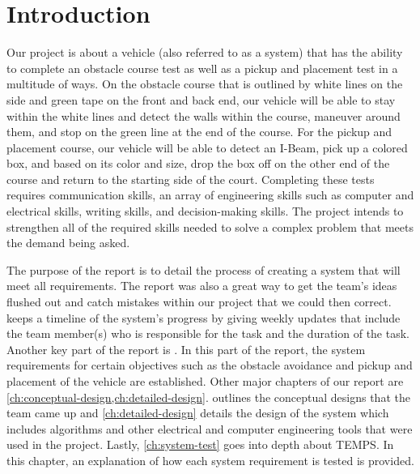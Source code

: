 \documentclass[12pt]{report}
\begin{document}
\chapter{Introduction}\label{ch:introduction}
\onehalfspacing

Our project is about a vehicle (also referred to as a system) that has the ability to complete an obstacle course test as well as a pickup and placement test in a multitude of ways. On the obstacle course that is outlined by white lines on the side and green tape on the front and back end, our vehicle will be able to stay within the white lines and detect the walls within the course, maneuver around them, and stop on the green line at the end of the course. For the pickup and placement course, our vehicle will be able to detect an I-Beam, pick up a colored box, and based on its color and size, drop the box off on the other end of the course and return to the starting side of the court. Completing these tests requires communication skills, an array of engineering skills such as computer and electrical skills, writing skills, and decision-making skills. The project intends to strengthen all of the required skills needed to solve a complex problem that meets the demand being asked.

The purpose of the report is to detail the process of creating a system that will meet all requirements. The report was also a great way to get the team’s ideas flushed out and catch mistakes within our project that we could then correct.  keeps a timeline of the system’s progress by giving weekly updates that include the team member(s) who is responsible for the task and the duration of the task. Another key part of the report is . In this part of the report, the system requirements for certain objectives such as the obstacle avoidance and pickup and placement of the vehicle are established. Other major chapters of our report are \cref{ch:conceptual-design,ch:detailed-design}.  outlines the conceptual designs that the team came up and \cref{ch:detailed-design} details the design of the system which includes algorithms and other electrical and computer engineering tools that were used in the project. Lastly, \cref{ch:system-test} goes into depth about \gls{TEMPS}. In this chapter, an explanation of how each system requirement is tested is provided.
\end{document}
